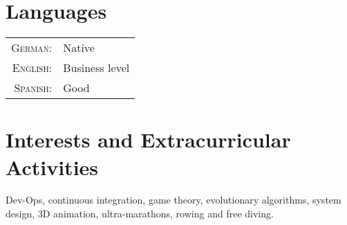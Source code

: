 \documentclass[a4paper,10pt]{article}
\begin{document}
\section{Languages}
\begin{tabular}{rl}
\textsc{German:}  & Native \\
\textsc{English:} & Business level \\
\textsc{Spanish:} & Good \\
\end{tabular}

\section{Interests and Extracurricular Activities }
Dev-Ops, continuous integration, game theory, evolutionary algorithms, system
design, 3D animation, ultra-marathons, rowing and free diving.
\end{document}

